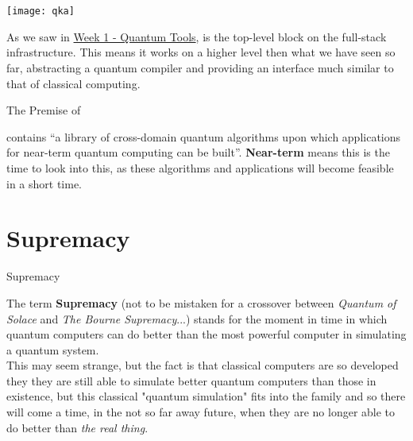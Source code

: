 \documentclass[aspectratio=43]{beamer}
\begin{document}
\section{\qka}
\begin{frame}{\qka}
    \begin{center}
        \texttt{[image: qka]}
    \end{center}
    \begin{card}
        As we saw in \href{\weekOne}{Week 1 - Quantum Tools}, \qka is the top-level block on the \qk full-stack infrastructure. This means it works on a higher level then what we have seen so far, abstracting a quantum compiler and providing an interface much similar to that of classical computing.
    \end{card}
\pagenumber
\end{frame}

\begin{frame}{The Premise of \qka}
    \begin{card}
        \qka contains ``a library of cross-domain quantum algorithms upon which applications for near-term quantum computing can be built''. \textbf{Near-term} means this is the time to look into this, as these algorithms and applications will become feasible in a short time. 
    \end{card}
\pagenumber
\end{frame}

\section{\q Supremacy}
\begin{frame}{\q Supremacy}
    \begin{card}
        The term \textbf{\q Supremacy} (not to be mistaken for a crossover between \textit{Quantum of Solace} and \textit{The Bourne Supremacy}...) stands for the moment in time in which quantum computers can do better than the most powerful computer in simulating a quantum system.\\
        This may seem strange, but the fact is that classical computers are so developed they they are still able to simulate better quantum computers than those in existence, but this classical "quantum simulation" fits into the \np family and so there will come a time, in the not so far away future, when they are no longer able to do better than \textit{the real thing}. 
    \end{card}
\pagenumber
\end{frame}
\end{document}
